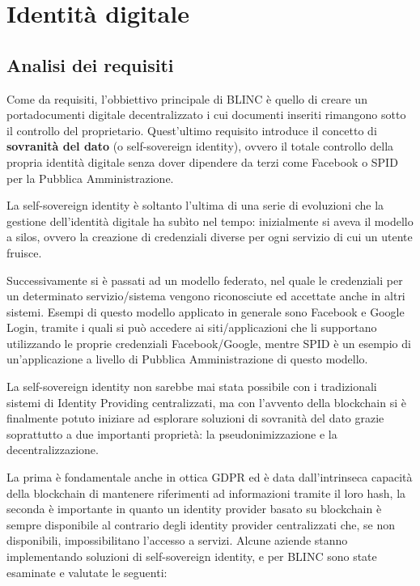 \chapter{Identit\`a digitale}

\section{Analisi dei requisiti}
Come da requisiti, l’obbiettivo principale di BLINC è quello di creare un portadocumenti digitale decentralizzato
i cui documenti inseriti rimangono sotto il controllo del proprietario.
Quest’ultimo requisito introduce il concetto di \textbf{sovranità del dato} (o self-sovereign identity), ovvero il totale
controllo della propria identità digitale senza dover dipendere da terzi come Facebook o SPID per la Pubblica Amministrazione.

La self-sovereign identity è soltanto l’ultima di una serie di evoluzioni che la gestione dell’identità digitale
ha subìto nel tempo: inizialmente si aveva il modello a silos, ovvero la creazione di credenziali diverse per ogni
servizio di cui un utente fruisce.

Successivamente si è passati ad un modello federato, nel quale le credenziali per un determinato servizio/sistema
vengono riconosciute ed accettate anche in altri sistemi. Esempi di questo modello applicato in generale sono
Facebook e Google Login, tramite i quali si può accedere ai siti/applicazioni che li supportano utilizzando le
proprie credenziali Facebook/Google, mentre SPID è un esempio di un’applicazione a livello di Pubblica Amministrazione 
di questo modello. 

La self-sovereign identity non sarebbe mai stata possibile con i tradizionali sistemi di Identity Providing
centralizzati, ma con l’avvento della blockchain si è finalmente potuto iniziare ad esplorare soluzioni di sovranità
del dato grazie soprattutto a due importanti proprietà: la pseudonimizzazione e la decentralizzazione.

La prima è fondamentale anche in ottica GDPR ed è data dall’intrinseca capacità della blockchain di mantenere 
riferimenti ad informazioni tramite il loro hash, la seconda è importante in quanto un 
identity provider basato su blockchain è sempre disponibile al contrario degli identity provider centralizzati che,
se non disponibili, impossibilitano l’accesso a servizi.
Alcune aziende stanno implementando soluzioni di self-sovereign identity, e per BLINC sono state esaminate e
valutate le seguenti:

